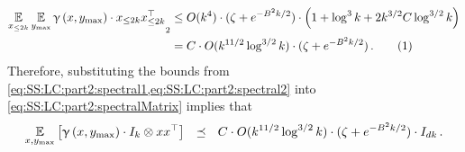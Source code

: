\documentclass[11pt,letterpaper]{article}
\theoremstyle{plain}
\theoremstyle{definition}
\theoremstyle{remark}
\newcommand{\yesnum}{\addtocounter{equation}{1}\tag{\theequation}}
\newcommand{\inparen}[1]{\ensuremath{\left(#1\right)}}
\newcommand{\insquare}[1]{\ensuremath{\left[#1\right]}}
\let\norm\relax
\newcommand{\norm}[1]{\ensuremath{\left\lVert #1 \right\rVert}}
\newcommand{\E}{\operatornamewithlimits{\mathbb{E}}}
\newcommand{\Ex}{\E}
\renewcommand{\gamma}{\upgamma}
\newcommand{\ymax}{y_{\max}}
\begin{document}
{{    \begin{align*}
        \norm{\Ex_{x_{\leq 2k}}\Ex_{\ymax}{
                \gamma\inparen{x,\ymax}
            }\cdot  x_{\leq 2k}x_{\leq 2k}^\top}_2
        &\leq 
        O(k^4)\cdot
            (\zeta + e^{-B^2 k/2})\cdot
            \Bigl(
                1
                +\log^3{k}
                +2k^{3/2}C \log^{3/2}{k}
            \Bigr)\\
        &=C
        \cdot O(k^{11/2}\log^{3/2}{k})
        \cdot (\zeta + e^{-B^2 k/2})\,.
        \yesnum\label{eq:SS:LC:part2:spectral2}
    \end{align*} 
    Therefore, substituting the bounds from \cref{eq:SS:LC:part2:spectral1,eq:SS:LC:part2:spectral2} into \cref{eq:SS:LC:part2:spectralMatrix} implies that 
    \[
        \Ex_{x,\ymax}\insquare{
            \gamma\inparen{x,\ymax}\cdot I_{k}\otimes xx^\top
            }
        ~~\preceq~~
        C
        \cdot O(k^{11/2}\log^{3/2}{k})
        \cdot (\zeta + e^{-B^2 k/2})
        \cdot 
        I_{dk}\,.
    \]
    

}}
\end{document}
